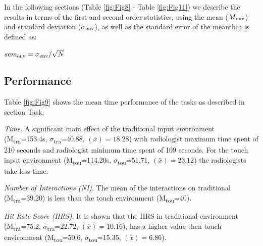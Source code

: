 \documentclass{chi-ext}
\begin{document}


In the following sections (Table \ref{fig:Fig8} - Table \ref{fig:Fig11}) we describe the results in terms of the first and second order statistics, using the mean ($M\textsubscript{env}$) and standard deviation ($\sigma\textsubscript{env}$), as well as the standard error of the mean\footnotemark that is defined as:

\begin{center}
$sem\textsubscript{env} = \sigma\textsubscript{env}/\sqrt{N}$
\end{center}

\subsection{Performance}

Table \ref{fig:Fig9} shows the mean time performance of the tasks as described in section Task.

\textit{Time}. A significant main effect of the traditional input environment (M\textsubscript{tra}=153.4s, $\sigma$\textsubscript{tra}=40.88, {}$\left({\bar x}\right)=18.28$) with radiologist maximum time spent of 210 seconds and radiologist minimum time spent of 109 seconds. For the touch input environment (M\textsubscript{tou}=114.20s, $\sigma$\textsubscript{tou}=51.71, {}$\left({\bar x}\right)=23.12$) the radiologists take less time.
  
\textit{Number of Interactions (NI)}. The mean of the interactions on traditional (M\textsubscript{tra}=39.20) is less than the touch environment (M\textsubscript{tou}=40).

\textit{Hit Rate Score (HRS)}. It is shown that the HRS in traditional environment (M\textsubscript{tra}=75.2, $\sigma$\textsubscript{tra}=22.72, {}$\left({\bar x}\right)=10.16$), has a higher value then touch environment (M\textsubscript{tou}=50.6, $\sigma$\textsubscript{tou}=15.35, {}$\left({\bar x}\right)=6.86$).
\end{document}
